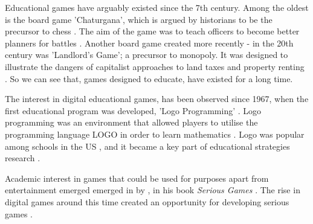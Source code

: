 \documentclass[a4paper,11.5pt]{report}
\numberwithin{figure}{section}
\numberwithin{table}{section}
\numberwithin{equation}{section}
\numberwithin{equation}{section}
\begin{document}
Educational games have arguably existed since the 7th century. Among the oldest is the board game 'Chaturgana', which is argued by historians to be the precursor to chess \citep{Wilkinson2016}. The aim of the game was to teach officers to become better planners for battles \citep{Wilkinson2016}. Another board game created more recently - in the 20th century was 'Landlord's Game'; a precursor to monopoly. It was designed to illustrate the dangers of capitalist approaches to land taxes and property renting \citep{Wilkinson2016}. So we can see that, games designed to educate, have existed for a long time.





The interest in digital educational games, has been observed since 1967, when the first educational program was developed, 'Logo Programming' \citep{hayes2008} . Logo programming was an environment that allowed players to utilise the programming language LOGO in order to learn mathematics \citep{feurzeig1969}. Logo was popular among schools in the US \citep{lehrer1986}, and it became a key part of educational strategies research \citep{hayes2008}. 

Academic interest in games that could be used for purposes apart from entertainment emerged emerged in \citeyear{abt1970} by \citeauthor{abt1970}, in his book \textit{Serious Games} \citep{Breuer2010}. The rise in digital games around this time created an opportunity for developing serious games \citep{Wilkinson2016}. 
\end{document}
